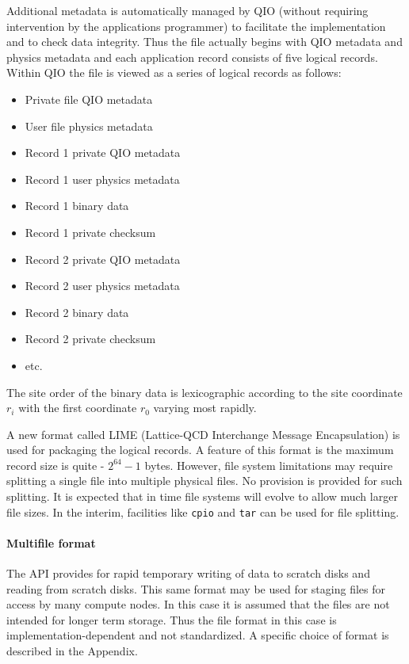 \documentclass[12pt,letterpaper]{article}
\begin{document}
Additional metadata is automatically managed by QIO (without requiring
intervention by the applications programmer) to facilitate the
implementation and to check data integrity.  Thus the file actually
begins with QIO metadata and physics metadata and each application
record consists of five logical records.  Within QIO the file is
viewed as a series of logical records as follows:
%
\begin{itemize}
  \item Private file QIO metadata
  \item User file physics metadata
  \item Record 1 private QIO metadata
  \item Record 1 user physics metadata
  \item Record 1 binary data
  \item Record 1 private checksum
  \item Record 2 private QIO metadata
  \item Record 2 user physics metadata
  \item Record 2 binary data
  \item Record 2 private checksum
  \item etc.
\end{itemize}
%
The site order of the binary data is lexicographic according to the
site coordinate $r_i$ with the first coordinate $r_0$ varying most
rapidly.

A new format called LIME (Lattice-QCD Interchange Message Encapsulation)
is used for packaging the logical records. A feature of this format is
the maximum record size is quite - $2^{64}-1$ bytes. However,
file system limitations may require splitting a single file into 
multiple physical files. No provision is provided for such splitting.
It is expected that in time file systems will evolve to allow much
larger file sizes. In the interim, facilities like \verb|cpio| and
\verb|tar| can be used for file splitting.

\paragraph{Multifile format}

The API provides for rapid temporary writing of data to scratch disks
and reading from scratch disks.  This same format may be used for
staging files for access by many compute nodes.  In this case it is
assumed that the files are not intended for longer term storage.  Thus
the file format in this case is implementation-dependent and not
standardized.  A specific choice of format is described in the
Appendix.
\end{document}
